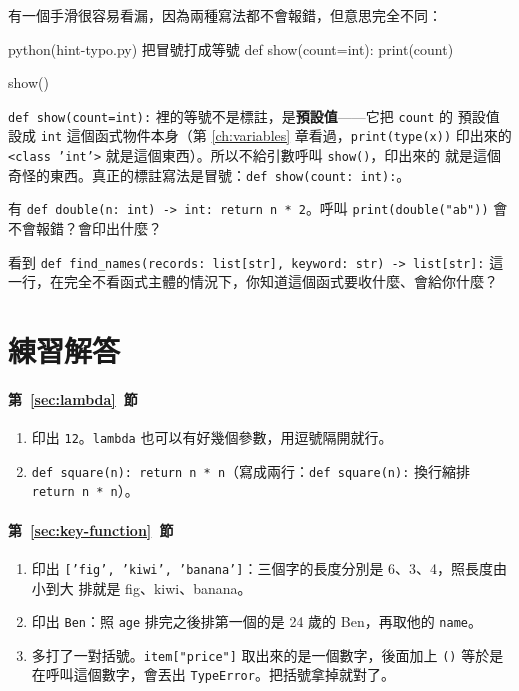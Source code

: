 有一個手滑很容易看漏，因為兩種寫法都不會報錯，但意思完全不同：

\begin{example}{python}{(hint-typo.py) 把冒號打成等號}
def show(count=int):
    print(count)


show()
\end{example}


\texttt{def show(count=int):} 裡的等號不是標註，是\textbf{預設值}——它把 \texttt{count} 的
預設值設成 \texttt{int} 這個函式物件本身（第 \ref{ch:variables} 章看過，\texttt{print(type(x))}
印出來的 \texttt{<class 'int'>} 就是這個東西）。所以不給引數呼叫 \texttt{show()}，印出來的
就是這個奇怪的東西。真正的標註寫法是冒號：\texttt{def show(count: int):}。

\begin{drills}[label=drills:type-hints]
\item 有 \texttt{def double(n: int) -> int: return n * 2}。呼叫
\texttt{print(double("ab"))} 會不會報錯？會印出什麼？
\item 看到 \texttt{def find\_names(records: list[str], keyword: str) -> list[str]:}
這一行，在完全不看函式主體的情況下，你知道這個函式要收什麼、會給你什麼？
\end{drills}

\section*{練習解答}

\paragraph{第~\ref{sec:lambda}~節}
\begin{enumerate}
\item 印出 \texttt{12}。\texttt{lambda} 也可以有好幾個參數，用逗號隔開就行。
\item \texttt{def square(n): return n * n}（寫成兩行：\texttt{def square(n):} 換行縮排
\texttt{return n * n}）。
\end{enumerate}

\paragraph{第~\ref{sec:key-function}~節}
\begin{enumerate}
\item 印出 \texttt{['fig', 'kiwi', 'banana']}：三個字的長度分別是 6、3、4，照長度由小到大
排就是 fig、kiwi、banana。
\item 印出 \texttt{Ben}：照 \texttt{age} 排完之後排第一個的是 24 歲的 Ben，再取他的
\texttt{name}。
\item 多打了一對括號。\texttt{item["price"]} 取出來的是一個數字，後面加上 \texttt{()}
等於是在呼叫這個數字，會丟出 \texttt{TypeError}。把括號拿掉就對了。
\end{enumerate}

